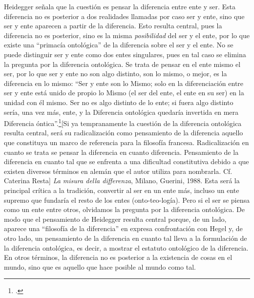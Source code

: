 Heidegger señala que la cuestión es pensar la diferencia entre ente y
ser. Esta diferencia no es posterior a dos realidades llamadas por caso
ser y ente, sino que ser y ente aparecen a partir de la diferencia. Esto
resulta central, pues la diferencia no es posterior, sino es la misma
\emph{posibilidad} del ser y el ente, por lo que existe una \enquote{primacía
ontológica} de la diferencia sobre el ser y el ente. No se puede
distinguir ser y ente como dos entes singulares, pues en tal caso se
elimina la pregunta por la diferencia ontológica. Se trata de pensar en
el ente mismo el ser, por lo que ser y ente no son algo distinto, son lo
mismo, o mejor, es la diferencia en lo mismo: \enquote{Ser y ente son lo Mismo;
solo en la diferenciación entre ser y ente está unido de propio lo Mismo
(el ser del ente, el ente en su ser) en la unidad con él mismo. Ser no
es algo distinto de lo ente; si fuera algo distinto sería, una vez más,
ente, y la Diferencia ontológica quedaría invertida en mera Diferencia
óntica}.\footcites[176]{poggeler1993}[Si ya tempranamente la
  cuestión de la diferencia ontológica resulta central, será su
  radicalización como pensamiento de la diferencia aquello que
  constituya un marco de referencia para la filosofía francesa.
  Radicalización en cuanto se trata se pensar la diferencia en cuanto
  diferencia. Pensamiento de la diferencia en cuanto tal que se enfrenta
  a una dificultad constitutiva debido a que existen diversos términos
  en alemán que el autor utiliza para nombrarla. Cf. Caterina Resta]
  {\emph{La misura della differenza}, Milano, Guerini, 1988.} Esta será
la principal crítica a la tradición, convertir al ser en un ente más,
incluso un ente supremo que fundaría el resto de los entes
(onto-teo-logía). Pero si el ser se piensa como un ente entre otros,
olvidamos la pregunta por la diferencia ontológica. De modo que el
pensamiento de Heidegger resulta central porque, de un lado, aparece una
\enquote{filosofía de la diferencia} en expresa confrontación con Hegel y, de
otro lado, un pensamiento de la diferencia en cuanto tal lleva a la
formulación de la diferencia ontológica, es decir, a mostrar el estatuto
ontológico de la diferencia. En otros términos, la diferencia no es
posterior a la existencia de cosas en el mundo, sino que es aquello que
hace posible al mundo como tal.

